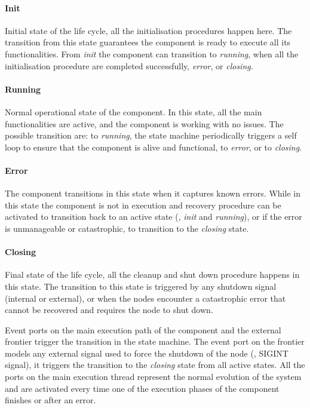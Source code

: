 \paragraph{Init} Initial state of the life cycle, all the initialisation procedures happen here. The transition from this state guarantees the component is ready to execute all its functionalities. From \textit{init} the component can transition to \textit{running}, when all the initialisation procedure are completed successfully, \textit{error}, or \textit{closing}.
\paragraph{Running} Normal operational state of the component. In this state, all the main functionalities are active, and the component is working with no issues. The possible transition are: to \textit{running}, the state machine periodically triggers a self loop to ensure that the component is alive and functional, to \textit{error},  or to \textit{closing}.
\paragraph{Error} The component transitions in this state when it captures known errors. While in this state the component is not in execution and recovery procedure can be activated to transition back to an active state (\ie, \textit{init} and \textit{running}), or if the error is unmanageable or catastrophic, to transition to the \textit{closing} state.
\paragraph{Closing} Final state of the life cycle, all the cleanup and shut down procedure happens in this state. The transition to this state is triggered by any shutdown signal (internal or external), or when the nodes encounter a catastrophic error that cannot be recovered and requires the node to shut down.
\medskip

Event ports on the main execution path of the component and the external frontier trigger the transition in the state machine. The event port on the frontier models any external signal used to force the shutdown of the node (\eg, SIGINT signal), it triggers the transition to the \textit{closing} state from all active states. All the ports on the main execution thread represent the normal evolution of the system and are activated every time one of the execution phases of the component finishes or after an error.

